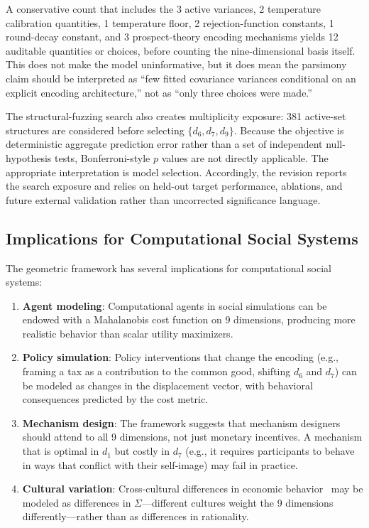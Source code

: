\documentclass[journal]{IEEEtran}
\begin{document}
A conservative count that includes the 3 active variances, 2 temperature calibration quantities, 1 temperature floor, 2 rejection-function constants, 1 round-decay constant, and 3 prospect-theory encoding mechanisms yields 12 auditable quantities or choices, before counting the nine-dimensional basis itself.
This does not make the model uninformative, but it does mean the parsimony claim should be interpreted as ``few fitted covariance variances conditional on an explicit encoding architecture,'' not as ``only three choices were made.''

The structural-fuzzing search also creates multiplicity exposure: 381 active-set structures are considered before selecting $\{d_6,d_7,d_9\}$.
Because the objective is deterministic aggregate prediction error rather than a set of independent null-hypothesis tests, Bonferroni-style $p$ values are not directly applicable.
The appropriate interpretation is model selection.
Accordingly, the revision reports the search exposure and relies on held-out target performance, ablations, and future external validation rather than uncorrected significance language.

\subsection{Implications for Computational Social Systems}

The geometric framework has several implications for computational social systems:
\begin{enumerate}
    \item \textbf{Agent modeling}: Computational agents in social simulations can be endowed with a Mahalanobis cost function on 9 dimensions, producing more realistic behavior than scalar utility maximizers.
    \item \textbf{Policy simulation}: Policy interventions that change the encoding (e.g., framing a tax as a contribution to the common good, shifting $d_6$ and $d_7$) can be modeled as changes in the displacement vector, with behavioral consequences predicted by the cost metric.
    \item \textbf{Mechanism design}: The framework suggests that mechanism designers should attend to all 9 dimensions, not just monetary incentives. A mechanism that is optimal in $d_1$ but costly in $d_7$ (e.g., it requires participants to behave in ways that conflict with their self-image) may fail in practice.
    \item \textbf{Cultural variation}: Cross-cultural differences in economic behavior~\cite{henrich2010} may be modeled as differences in $\Sigma$---different cultures weight the 9 dimensions differently---rather than as differences in rationality.
\end{enumerate}
\end{document}
